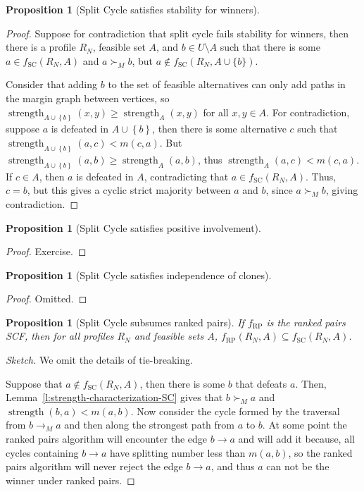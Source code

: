 \documentclass{book}
\theoremstyle{plain}
\newtheorem{proposition}[theorem]{Proposition}
\theoremstyle{definition}
\theoremstyle{remark}
\newcommand{\set}[1]{\left\{#1\right\}}
\begin{document}
\begin{proposition}[Split Cycle satisfies stability for winners]
\end{proposition}
\begin{proof}
    Suppose for contradiction that 
    split cycle fails stability for winners, then there is a profile $R_N$,
    feasible set $A$, and $b \in U \setminus A$ such that there is some 
    $a \in f_{\text{SC}}(R_N, A)$ and $a \succ_M b$, but $a \notin f_{\text{SC}}(R_N, A \cup \{b\})$.

    Consider that adding $b$ to the set of feasible alternatives can only 
    add paths in the margin graph between vertices, 
    so $\operatorname{strength}_{A \cup \set{b}}(x, y) \geq \operatorname{strength}_A(x, y)$
    for all $x, y \in A$.
    For contradiction, suppose
    $a$ is defeated in
    $A \cup \set{b}$, then there is some alternative $c$ such that
    $\operatorname{strength}_{A \cup \set{b}}(a, c) < m(c, a)$.
    But $\operatorname{strength}_{A \cup \set{b}}(a, b) \geq \operatorname{strength}_A(a, b)$, 
    thus $\operatorname{strength}_{A}(a, c) < m(c, a)$.
    If $c \in A$, then $a$ is defeated in $A$, contradicting that $a \in f_{\text{SC}}(R_N, A)$.
    Thus, $c = b$, but this gives a cyclic strict 
    majority between $a$ and $b$, since $a \succ_M b$, giving contradiction.
\end{proof}

\begin{proposition}[Split Cycle satisfies positive involvement]
\end{proposition}
\begin{proof}
    Exercise.
\end{proof}

\begin{proposition}[Split Cycle satisfies independence of clones]
\end{proposition}
\begin{proof}
    Omitted.
\end{proof}

\begin{proposition}[Split Cycle subsumes ranked pairs]
    If $f_{\text{RP}}$ is the ranked pairs SCF, then for all profiles $R_N$ and feasible sets $A$,
    $f_{\text{RP}}(R_N, A) \subseteq f_{\text{SC}}(R_N, A)$.
\end{proposition}

\begin{proof}[Sketch]
    We omit the details of tie-breaking.

    Suppose that $a \notin f_{\text{SC}}(R_N, A)$, then there is some $b$ that defeats $a$.
    Then, Lemma~\ref{l:strength-characterization-SC} gives that 
    $b \succ_M a$ and $\operatorname{strength}(b, a) < m(a, b)$.
    Now consider the cycle formed by the traversal 
    from $b \to_M a$ and then along the strongest path from $a$ to $b$.
    At some point the ranked pairs algorithm will 
    encounter the edge 
    $b \to a$ and will add it because, 
    all cycles containing $b \to a$ have splitting number less than $m(a, b)$,
    so the ranked pairs algorithm will never reject the edge $b \to a$, and thus $a$ can not be the winner under ranked pairs.
\end{proof}
\end{document}
